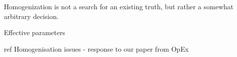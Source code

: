 
Homogenization is not a search for an existing truth, but rather a somewhat arbitrary decision.



Effective parameters


ref Homogenisation issues - response to our paper from OpEx
\cite{rockstuhl2008transition}
\cite{paul2011reflection}
\cite{andryieuski2012bloch}
\cite{andryieuski2010homogenization} 
\cite{simovski2007bloch}
\cite{simovski2009material}
\cite{simovski2011electromagnetic}
\cite{mortensen2010unambiguous}



